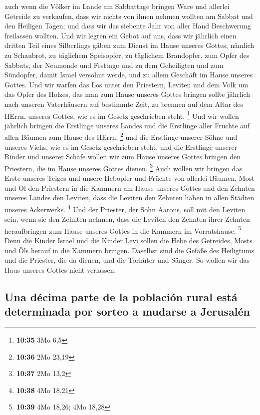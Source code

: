  auch wenn die Völker im Lande am Sabbattage bringen Ware
und allerlei Getreide zu verkaufen, dass wir nichts von ihnen nehmen
wollten am Sabbat und den Heiligen Tagen; und dass wir das siebente Jahr
von aller Hand Beschwerung freilassen wollten.  Und wir
legten ein Gebot auf uns, dass wir jährlich einen dritten Teil eines
Silberlings gäben zum Dienst im Hause unseres Gottes, 
nämlich zu Schaubrot, zu täglichem Speisopfer, zu täglichem Brandopfer,
zum Opfer des Sabbats, der Neumonde und Festtage und zu dem Geheiligten
und zum Sündopfer, damit Israel versöhnt werde, und zu allem Geschäft im
Hause unseres Gottes.  Und wir warfen das Los unter den
Priestern, Leviten und dem Volk um das Opfer des Holzes, das man zum
Hause unseres Gottes bringen sollte jährlich nach unseren Vaterhäusern
auf bestimmte Zeit, zu brennen auf dem Altar des HErrn, unseres Gottes,
wie es im Gesetz geschrieben steht. \footnote{\textbf{10:35} 3Mo 6,5}
 Und wir wollen jährlich bringen die Erstlinge unseres
Landes und die Erstlinge aller Früchte auf allen Bäumen zum Hause des
HErrn; \footnote{\textbf{10:36} 2Mo 23,19}  und die
Erstlinge unserer Söhne und unseres Viehs, wie es im Gesetz geschrieben
steht, und die Erstlinge unserer Rinder und unserer Schafe wollen wir
zum Hause unseres Gottes bringen den Priestern, die im Hause unseres
Gottes dienen. \footnote{\textbf{10:37} 2Mo 13,2}  Auch
wollen wir bringen das Erste unseres Teiges und unsere Hebopfer und
Früchte von allerlei Bäumen, Most und Öl den Priestern in die Kammern am
Hause unseres Gottes und den Zehnten unseres Landes den Leviten, dass
die Leviten den Zehnten haben in allen Städten unseres Ackerwerks.
\footnote{\textbf{10:38} 4Mo 18,21}  Und der Priester,
der Sohn Aarons, soll mit den Leviten sein, wenn sie den Zehnten nehmen,
dass die Leviten den Zehnten ihrer Zehnten heraufbringen zum Hause
unseres Gottes in die Kammern im Vorratshause. \footnote{\textbf{10:39}
  4Mo 18,26; 4Mo 18,28}  Denn die Kinder Israel und die
Kinder Levi sollen die Hebe des Getreides, Mosts und Öls herauf in die
Kammern bringen. Daselbst sind die Gefäße des Heiligtums und die
Priester, die da dienen, und die Torhüter und Sänger. So wollen wir das
Haus unseres Gottes nicht verlassen.

\hypertarget{una-duxe9cima-parte-de-la-poblaciuxf3n-rural-estuxe1-determinada-por-sorteo-a-mudarse-a-jerusaluxe9n}{%
\subsection{Una décima parte de la población rural está determinada por
sorteo a mudarse a
Jerusalén}\label{una-duxe9cima-parte-de-la-poblaciuxf3n-rural-estuxe1-determinada-por-sorteo-a-mudarse-a-jerusaluxe9n}}

